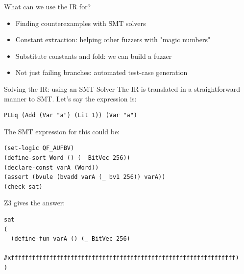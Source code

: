 \documentclass[aspectratio=169]{beamer}
\begin{document}
\begin{frame}[fragile=singleslide]{What can we use the IR for?}
\begin{itemize}
\item Finding counterexamples with SMT solvers
\item Constant extraction: helping other fuzzers with "magic numbers"
\item Substitute constants and fold: we can build a fuzzer
\item Not just failing branches: automated test-case generation
\end{itemize}

\end{frame}

%
%
%

\begin{frame}[fragile=singleslide]{Solving the IR: using an SMT Solver}
The IR is translated in a straightforward manner to SMT. Let's say the expression is:

\begin{Verbatim}[frame=single, framerule=0.2mm, framesep=2mm,fontsize=\footnotesize]
PLEq (Add (Var "a") (Lit 1)) (Var "a")
\end{Verbatim}

The SMT expression for this could be:

\begin{Verbatim}[frame=single, framerule=0.2mm, framesep=2mm,fontsize=\footnotesize]
(set-logic QF_AUFBV)
(define-sort Word () (_ BitVec 256))
(declare-const varA (Word))
(assert (bvule (bvadd varA (_ bv1 256)) varA))
(check-sat)
\end{Verbatim}

Z3 gives the answer:

\begin{Verbatim}[frame=single, framerule=0.2mm, framesep=2mm,fontsize=\footnotesize]
sat
(
  (define-fun varA () (_ BitVec 256)
    #xffffffffffffffffffffffffffffffffffffffffffffffffffffffffffffffff)
)
\end{Verbatim}
\end{frame}
\end{document}
